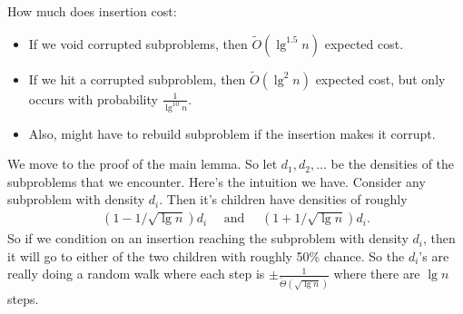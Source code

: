 \documentclass{report}
\begin{document}
\noindent How much does insertion cost:
\begin{itemize}
    \item If we void corrupted subproblems, then $\widetilde O(\lg^{1.5}n)$ expected cost.
    \item If we hit a corrupted subproblem, then $\widetilde O(\lg^2 n)$ expected cost, but only occurs with probability $\frac{1}{\lg^{10} n}$.
    \item Also, might have to rebuild subproblem if the insertion makes it corrupt. 
\end{itemize}
\noindent We move to the proof of the main lemma. So let $d_1, d_2, \ldots$ be the densities of the subproblems that we encounter. Here's the intuition we have. Consider any subproblem with density $d_i$. Then it's children have densities of roughly
\begin{align*}
    (1 - 1/\sqrt{\lg n}) d_i \quad \text{ and } \quad (1 + 1/\sqrt{\lg n}) d_i.
\end{align*}
So if we condition on an insertion reaching the subproblem with density $d_i$, then it will go to either of the two children with roughly 50\% chance. So the $d_i$'s are really doing a random walk where each step is $\pm \frac{1}{\widetilde \Theta(\sqrt{\lg n})}$ where there are $\lg n$ steps. 
\end{document}
